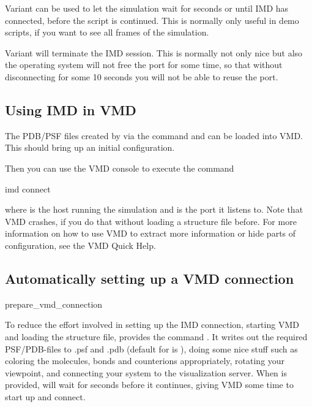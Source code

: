 Variant  can be used to let the simulation wait for
 seconds or until IMD has connected, before the script is
continued. This is normally only useful in demo scripts, if you want
to see all frames of the simulation.

Variant  will terminate the IMD session. This is normally
not only nice but also the operating system will not free the port for
some time, so that without disconnecting for some 10 seconds you will
not be able to reuse the port.

\subsection{Using IMD in VMD}

The PDB/PSF files created by \es via the command  and
 can be loaded into VMD. This should bring up an initial
configuration.

Then you can use the VMD console to execute the command
\begin{code}
  imd connect  
\end{code}
where  is the host running the simulation and  is
the port it listens to. Note that VMD crashes, if you do that without
loading a structure file before.  For more information on how to use
VMD to extract more information or hide parts of configuration, see
the VMD Quick Help.

\subsection{Automatically setting up a VMD connection}

\begin{essyntax}
prepare_vmd_connection 
\end{essyntax}

To reduce the effort involved in setting up the IMD connection,
starting VMD and loading the structure file, \es provides the command
.  It writes out the required
PSF/PDB-files to .psf and .pdb (default
for  is ), doing some nice stuff such as
coloring the molecules, bonds and counterions appropriately, rotating
your viewpoint, and connecting your system to the visualization
server. When  is provided, \es will wait for 
seconds before it continues, giving VMD some time to start up and
connect.

